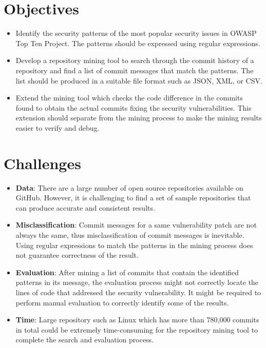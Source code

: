 \documentclass[12pt, a4paper]{report}
\begin{document}
\section{Objectives}
\label{sec:objectives}
\begin{itemize}
	\item Identify the security patterns of the most popular security issues in OWASP Top Ten Project.
	The patterns should be expressed using regular expressions.
	\item Develop a repository mining tool to search through the commit history of a repository and
	find a list of commit messages that match the patterns. The list should be produced in a suitable
	file format such as JSON, XML, or CSV.
	\item Extend the mining tool which checks the code difference in the commits found to obtain the
	actual commits fixing the security vulnerabilities. This extension should separate from the mining
	process to make the mining results easier to verify and debug.
\end{itemize}

\section{Challenges}
\begin{itemize}
	\item \textbf{Data}: There are a large number of open source repositories available on GitHub.
	However, it is challenging to find a set of sample repositories that can produce accurate and
	consistent results.
	\item \textbf{Misclassification}: Commit messages for a same vulnerability patch are not always
	the same, thus misclassification of commit messages is inevitable. Using regular expressions to
	match the patterns in the mining process does not guarantee correctness of the result.
	\item \textbf{Evaluation}: After mining a list of commits that contain the identified patterns in
	its message, the evaluation process might not correctly locate the lines of code that addressed
	the security vulnerability. It might be required to perform manual evaluation to correctly
	identify some of the results.
	\item \textbf{Time}: Large repository such as Linux which has more than 780,000 commits in total
	\cite{linux_repo} could be extremely time-consuming for the repository mining tool to complete the
	search and evaluation process.
\end{itemize}
\end{document}
